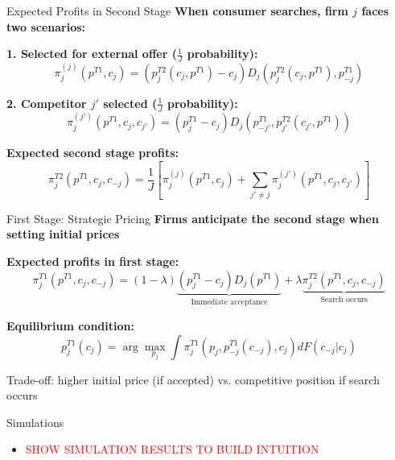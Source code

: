 \documentclass[10pt,aspectratio=169]{beamer}
\begin{document}
\begin{frame}{Expected Profits in Second Stage}
\textbf{When consumer searches, firm $j$ faces two scenarios:}

\vspace{0.3cm}

\textbf{1. Selected for external offer ($\frac{1}{J}$ probability):}
$$\pi^{(j)}_j(p^{T1}, c_j) = (p^{T2}_j(c_j, p^{T1}) - c_j) D_j(p^{T2}_j(c_j, p^{T1}), p^{T1}_{-j})$$

\vspace{0.3cm}

\textbf{2. Competitor $j'$ selected ($\frac{1}{J}$ probability):}
$$\pi^{(j')}_j(p^{T1}, c_j, c_{j'}) = (p^{T1}_j - c_j) D_j(p^{T1}_{-j'}, p^{T2}_{j'}(c_{j'}, p^{T1}))$$

\vspace{0.5cm}

\textbf{Expected second stage profits:}
$$\pi^{T2}_j(p^{T1}, c_j, c_{-j}) = \frac{1}{J}\left[\pi^{(j)}_j(p^{T1}, c_j) + \sum_{j' \neq j} \pi^{(j')}_j(p^{T1}, c_j, c_{j'})\right]$$
\end{frame}

\begin{frame}{First Stage: Strategic Pricing}
\textbf{Firms anticipate the second stage when setting initial prices}

\vspace{0.5cm}

\textbf{Expected profits in first stage:}
$$\pi^{T1}_j(p^{T1}, c_j, c_{-j}) = (1-\lambda)\underbrace{(p^{T1}_j - c_j)D_j(p^{T1})}_{\text{Immediate acceptance}} + \lambda \underbrace{\pi^{T2}_j(p^{T1}, c_j, c_{-j})}_{\text{Search occurs}}$$

\vspace{0.5cm}

\textbf{Equilibrium condition:}
$$p^{T1}_j(c_j) = \arg\max_{p_j} \int \pi^{T1}_j(p_j, p^{T1}_{-j}(c_{-j}), c_j) dF(c_{-j}|c_j)$$

\vspace{0.3cm}
Trade-off: higher initial price (if accepted) vs. competitive position if search occurs
\end{frame}


\begin{frame}{Simulations }
    \begin{itemize}
        \item \textcolor{red}{SHOW SIMULATION RESULTS TO BUILD INTUITION}
    \end{itemize}
\end{frame}
\end{document}
